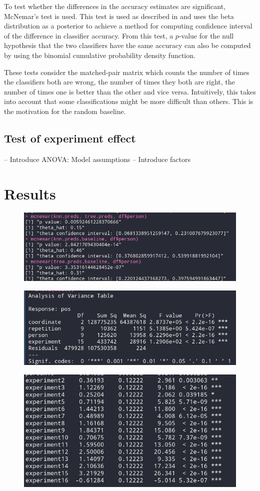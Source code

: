 \documentclass[12pt,fleqn]{article}
\begin{document}
To test whether the differences in the accuracy estimates are significant, McNemar's test is used. 
This test is used as described in \cite[Method 11.3.2]{Tue} and uses the beta distribution as a posterior to achieve a method for computing confidence interval of the difference in classifier accuracy.
From this test, a \(p\)-value for the null hypothesis that the two classifiers have the same accuracy can also be computed by using the binomial cumulative probability density function.

These tests consider the matched-pair matrix which counts the number of times the classifiers both are wrong, the number of times they both are right, the number of times one is better than the other and vice versa.
Intuitively, this takes into account that some classifications might be more difficult than others. 
This is the motivation for the random baseline.
\subsection{Test of experiment effect}

-- Introduce ANOVA: Model assumptions
-- Introduce factors



\section{Results}
\begin{figure}[H]
	\centering
	\includegraphics[width=.7\linewidth]{mcnemar_results}
\end{figure}
\begin{figure}[H]
\centering
\includegraphics[width=.7\linewidth]{p1_anova}
\end{figure}
\begin{figure}[H]
	\centering
	\includegraphics[width=.7\linewidth]{p1_anova_summay}
\end{figure}
\end{document}
